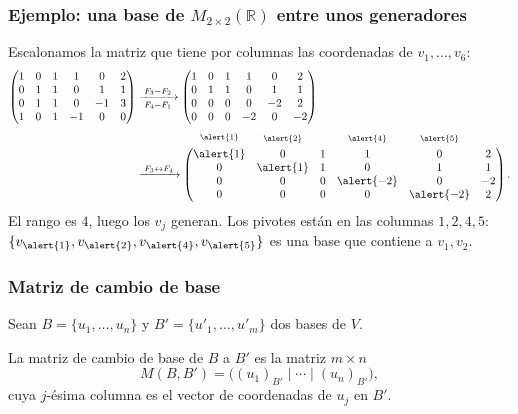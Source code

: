 \begin{frame}
    \frametitle{Ejemplo: una base de \(M_{2\times2}(\mathbb{R})\) entre unos generadores}

    \begin{example}
        Escalonamos la matriz que tiene por columnas las coordenadas de
        \(v_1,\ldots,v_6\):
        \begin{align*}
            \begin{pmatrix}
                1&0&1&1&0&2\\
                0&1&1&0&1&1\\
                0&1&1&0&-1&3\\
                1&0&1&-1&0&0
            \end{pmatrix}
            &\xrightarrow[\;F_4-F_1\;]{\;F_3-F_2\;}
            \begin{pmatrix}
                1&0&1&1&0&2\\
                0&1&1&0&1&1\\
                0&0&0&0&-2&2\\
                0&0&0&-2&0&-2
            \end{pmatrix}\\[4ex]
            &\xrightarrow{\;F_3\leftrightarrow F_4\;}
            \begin{pmatrix}
                \smash{\overset{\raisebox{1.5ex}{$\scriptstyle\alert{1}$}}{\alert{1}}}&\smash{\overset{\raisebox{1.5ex}{$\scriptstyle\alert{2}$}}{0}}&1&\smash{\overset{\raisebox{1.5ex}{$\scriptstyle\alert{4}$}}{1}}&\smash{\overset{\raisebox{1.5ex}{$\scriptstyle\alert{5}$}}{0}}&2\\
                0&\alert{1}&1&0&1&1\\
                0&0&0&\alert{-2}&0&-2\\
                0&0&0&0&\alert{-2}&2
            \end{pmatrix}.
        \end{align*}
        El rango es \(4\), luego los \(v_j\) generan. Los pivotes están
        en las columnas \(1,2,4,5\): \(\{v_{\alert{1}}, v_{\alert{2}}, v_{\alert{4}}, v_{\alert{5}}\}\) es una base
        que contiene a \(v_1,v_2\).
    \end{example}
\end{frame}








\begin{frame}
    \frametitle{Matriz de cambio de base}

    Sean $B=\{u_1,\ldots,u_n\}$ y $B'=\{u'_1,\ldots,u'_m\}$
    dos bases de $V$.

    \begin{definition}
        La \alert{matriz de cambio de base de $B$ a $B'$} es la
        matriz $m\times n$
        \[
            M(B,B')=\bigl((u_1)_{B'}\mid\cdots\mid(u_n)_{B'}\bigr),
        \]
        cuya $j$-ésima columna es el vector de coordenadas de $u_j$ en $B'$.
    \end{definition}
\end{frame}

